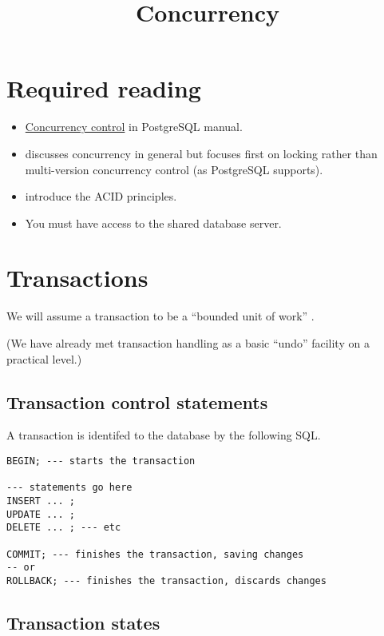 \documentclass[slides]{pgnotes}
\title{Concurrency}
\begin{document}
\maketitle

\tableofcontents

\section*{Required reading}

\begin{itemize}
\item \href{https://www.postgresql.org/docs/13/mvcc.html}{Concurrency control} in PostgreSQL manual.
\item \citep[Chapter 22]{connolly:2015:database} discusses concurrency in general but focuses first on locking rather than multi-version concurrency control (as PostgreSQL supports).
\item \citep{haerder:1983:principles} introduce the ACID principles.
\item You must have access to the shared database server.
\end{itemize}

\section{Transactions}

We will assume a transaction to be a ``bounded unit of work'' \citep{fowler:2003:patterns}.

(We have already met transaction handling as a basic ``undo'' facility on a practical level.)

\subsection{Transaction control statements}

A transaction is identifed to the database by the following SQL. 

\begin{verbatim}
BEGIN; --- starts the transaction

--- statements go here
INSERT ... ;
UPDATE ... ;
DELETE ... ; --- etc

COMMIT; --- finishes the transaction, saving changes
-- or
ROLLBACK; --- finishes the transaction, discards changes
\end{verbatim}

\subsection{Transaction states}
\end{document}
